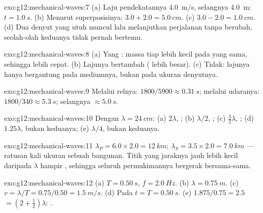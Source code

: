 \begin{solution}{exo:g12:mechanical-waves:7}
(a) Laju pendekatannya \qty{4.0}{m/s}, selangnya \qty{4.0}{m}:
$t = \qty{1.0}{s}$. (b) Menurut superposisinya:
$3.0 + 2.0 = \qty{5.0}{cm}$. (c) $3.0 - 2.0 = \qty{1.0}{cm}$. (d) Dua
denyut yang utuh muncul lalu melanjutkan perjalanan tanpa berubah,
seolah-olah keduanya tidak pernah bertemu.
\end{solution}

\begin{solution}{exo:g12:mechanical-waves:8}
(a) Yang : massa tiap  lebih kecil pada  yang sama,
sehingga  lebih cepat. (b) Lajunya bertambah (
lebih besar). (c) Tidak: lajunya hanya bergantung pada mediumnya, bukan
pada ukuran denyutnya.
\end{solution}

\begin{solution}{exo:g12:mechanical-waves:9}
Melalui relnya: $1800/5900 \approx \qty{0.31}{s}$; melalui udaranya:
$1800/340 \approx \qty{5.3}{s}$; selangnya $\approx \qty{5.0}{s}$.
\end{solution}

\begin{solution}{exo:g12:mechanical-waves:10}
Dengan $\lambda = \qty{24}{cm}$: (a) $2\lambda$, ;
(b) $\lambda/2$, ; (c) $\tfrac32\lambda$, ; (d) $1.25\lambda$, bukan keduanya; (e) $\lambda/4$, bukan
keduanya.
\end{solution}

\begin{solution}{exo:g12:mechanical-waves:11}
$\lambda_P = 6.0 \times 2.0 = \qty{12}{km}$;
$\lambda_S = 3.5 \times 2.0 = \qty{7.0}{km}$ --- ratusan kali ukuran
sebuah bangunan. Titik yang jaraknya jauh lebih kecil daripada $\lambda$
hampir , sehingga seluruh permukimannya bergerak bersama-sama.
\end{solution}

\begin{solution}{exo:g12:mechanical-waves:12}
(a) $T = \qty{0.50}{s}$, $f = \qty{2.0}{Hz}$.
(b) $\lambda = \qty{0.75}{m}$.
(c) $v = \lambda/T = 0.75/0.50 = \qty{1.5}{m/s}$.
(d) Pada $t = T = \qty{0.50}{s}$. (e) $1.875/0.75 = 2.5$  $= (2 + \tfrac12)\lambda$: .
\end{solution}

